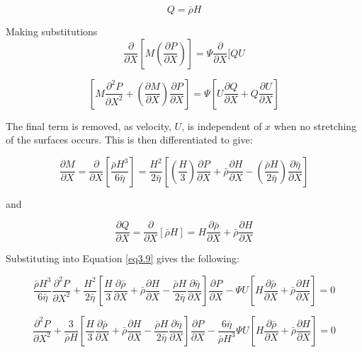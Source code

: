 \begin{equation}\label{eq3.7}
	Q=\bar{\rho} H
\end{equation}

Making substitutions
\begin{equation}\label{eq3.8}
	\frac{\partial}{\partial X}\left[M\left(\frac{\partial P}{\partial X}\right)\right]=\Psi \frac{\partial}{\partial X}[Q U
\end{equation}

\begin{equation}\label{eq3.9}
	\left[M \frac{\partial^{2} P}{\partial X^{2}}+\left(\frac{\partial M}{\partial X}\right) \frac{\partial P}{\partial X}\right]=\Psi\left[U \frac{\partial Q}{\partial X}+Q \frac{\partial U}{\partial X}\right]
\end{equation}

The final term is removed, as velocity, $U$, is independent of $x$ when no stretching of the surfaces occurs. This is then differentiated to give:

\begin{equation}\label{eq3.10}
	\frac{\partial M}{\partial X}=\frac{\partial}{\partial X}\left[\frac{\bar{\rho} H^{3}}{6 \bar{\eta}}\right]=\frac{H^{2}}{2 \bar{\eta}}\left[\left(\frac{H}{3}\right) \frac{\partial P}{\partial X}+\bar{\rho} \frac{\partial H}{\partial X}-\left(\frac{\bar{\rho} H}{2 \bar{\eta}}\right) \frac{\partial \bar{\eta}}{\partial X}\right]
\end{equation}

and

\begin{equation}\label{eq3.11}
	\frac{\partial Q}{\partial X}=\frac{\partial}{\partial X}[\bar{\rho} H]=H \frac{\partial \bar{\rho}}{\partial X}+\bar{\rho} \frac{\partial H}{\partial X}
\end{equation}

Substituting into Equation \ref{eq3.9} gives the following:

\begin{equation}\label{eq1.12}
	\frac{\bar{\rho} H^{3}}{6 \bar{\eta}} \frac{\partial^{2} P}{\partial X^{2}}+\frac{H^{2}}{2 \bar{\eta}}\left[\frac{H}{3} \frac{\partial \bar{\rho}}{\partial X}+\bar{\rho} \frac{\partial H}{\partial X}-\frac{\bar{\rho} H}{2 \bar{\eta}} \frac{\partial \bar{\eta}}{\partial X}\right] \frac{\partial P}{\partial X}-\Psi U\left[H \frac{\partial \bar{\rho}}{\partial X}+\bar{\rho} \frac{\partial H}{\partial X}\right]=0
\end{equation}

\begin{equation}\label{eq3.13}
	\frac{\partial^{2} P}{\partial X^{2}}+\frac{3}{\bar{\rho} H}\left[\frac{H}{3} \frac{\partial \bar{\rho}}{\partial X}+\bar{\rho} \frac{\partial H}{\partial X}-\frac{\bar{\rho} H}{2 \bar{\eta}} \frac{\partial \bar{\eta}}{\partial X}\right] \frac{\partial P}{\partial X}-\frac{6 \bar{\eta}}{\bar{\rho} H^{3}} \Psi U\left[H \frac{\partial \bar{\rho}}{\partial X}+\bar{\rho} \frac{\partial H}{\partial X}\right]=0
\end{equation}

